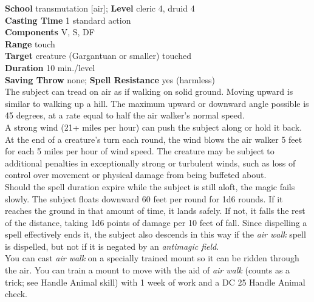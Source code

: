 \textbf{School }transmutation [air]; \textbf{Level} cleric 4, druid 4\\
\textbf{Casting Time} 1 standard action\\
\textbf{Components} V, S, DF\\
\textbf{Range} touch\\
\textbf{Target} creature (Gargantuan or smaller) touched\\
\textbf{Duration} 10 min./level\\
\textbf{Saving Throw} none; \textbf{Spell Resistance} yes (harmless)\\
The subject can tread on air as if walking on solid ground. Moving upward is similar to walking up a hill. The maximum upward or downward angle possible is 45 degrees, at a rate equal to half the air walker's normal speed.\\
A strong wind (21+ miles per hour) can push the subject along or hold it back. At the end of a creature's turn each round, the wind blows the air walker 5 feet for each 5 miles per hour of wind speed. The creature may be subject to additional penalties in exceptionally strong or turbulent winds, such as loss of control over movement or physical damage from being buffeted about.\\
Should the spell duration expire while the subject is still aloft, the magic fails slowly. The subject floats downward 60 feet per round for 1d6 rounds. If it reaches the ground in that amount of time, it lands safely. If not, it falls the rest of the distance, taking 1d6 points of damage per 10 feet of fall. Since dispelling a spell effectively ends it, the subject also descends in this way if the \textit{air walk }spell is dispelled, but not if it is negated by an \textit{antimagic field}.\\
You can cast \textit{air walk }on a specially trained mount so it can be ridden through the air. You can train a mount to move with the aid of \textit{air walk }(counts as a trick; see Handle Animal skill) with 1 week of work and a DC 25 Handle Animal check.\\

